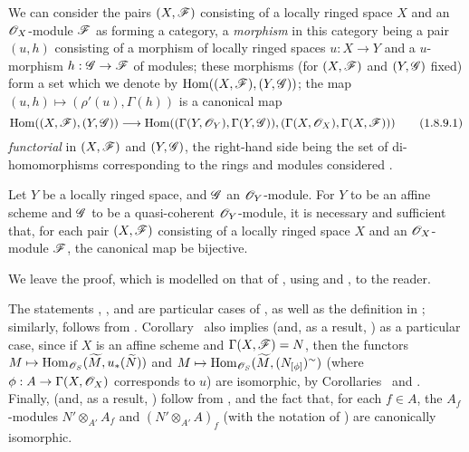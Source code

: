\begin{env}[1.8.9]
\label{1.1.8.9}
We can consider the pairs $(X,\mathscr{F})$ consisting of a locally ringed space $X$ and an $\mathscr{O}_X$-module $\mathscr{F}$ as forming a category, a \emph{morphism} in this category being a pair $(u,h)$ consisting of a morphism of locally ringed spaces
$u:X\to Y$ and a $u$-morphism $h:\sh{G}\to\sh{F}$ of modules;
these morphisms (for $(X,\mathscr{F})$ and $(Y,\mathscr{G})$ fixed) form a set which we denote by $\operatorname{Hom}((X,\mathscr{F}),(Y,\mathscr{G}))$;
the map $(u,h)\mapsto(\rho'(u),\Gamma(h))$ is a canonical map
\[
  \label{1.1.8.9.1}
  \Hom((X,\sh{F}),(Y,\sh{G}))\to\Hom((\Gamma(Y,\sh{O}_Y),\Gamma(Y,\sh{G})),(\Gamma(X,\sh{O}_X),\Gamma(X,\sh{F})))
  \tag{1.8.9.1}
\]
\emph{functorial} in $(X,\mathscr{F})$ and $(Y,\mathscr{G})$, the right-hand side being the set of di-homomorphisms corresponding to the rings and modules considered .
\end{env}

\begin{corollary}[1.8.10]
\label{1.1.8.10}
Let $Y$ be a locally ringed space, and $\mathscr{G}$ an $\mathscr{O}_Y$-module.
For $Y$ to be an affine scheme and $\mathscr{G}$ to be a quasi-coherent $\mathscr{O}_Y$-module, it is necessary and sufficient that, for each pair $(X,\mathscr{F})$ consisting of a locally ringed space $X$ and an $\mathscr{O}_X$-module $\mathscr{F}$, the canonical map  be bijective.
\end{corollary}

We leave the proof, which is modelled on that of , using  and , to the reader.

\begin{remark}[1.8.11]
\label{1.1.8.11}
The statements , , and  are particular cases of , as well as the definition in ;
similarly,  follows from .
Corollary~ also implies  (and, as a result, ) as a particular case, since if $X$ is an affine scheme and $\Gamma(X,\mathscr{F})=N$, then the functors $M\mapsto\Hom_{\sh{O}_S}(\widetilde{M},u_*(\widetilde{N}))$ and $M\mapsto\Hom_{\sh{O}_S}(\widetilde{M},(N_{[\vphi]})^\sim)$ (where $\vphi:A\to\Gamma(X,\sh{O}_X)$ corresponds to $u$) are isomorphic, by Corollaries~ and .
Finally,  (and, as a result, ) follow from , and the fact that, for each $f\in A$, the $A_f$-modules $N'\otimes_{A'}A_f$ and $(N'\otimes_{A'}A)_f$ (with the notation of ) are canonically isomorphic.
\end{remark}

